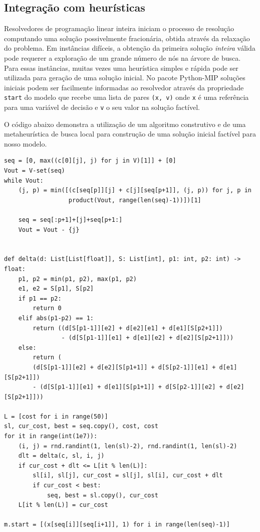 \documentclass[a4paper,11pt,fleqn]{article}
\begin{document}
\subsection{Integração com heurísticas}

Resolvedores de programação linear inteira iniciam o processo de resolução computando uma solução possivelmente fracionária, obtida através da relaxação do problema. Em instâncias difíceis, a obtenção da primeira solução \emph{inteira} válida pode requerer a exploração de um grande número de nós na árvore de busca. Para essas instâncias, muitas vezes uma heurística simples e rápida pode ser utilizada para geração de uma solução inicial. No pacote Python-MIP soluções iniciais podem ser facilmente informadas ao resolvedor através da propriedade \texttt{start} do modelo que recebe uma lista de pares \texttt{(x, v)} onde \texttt{x} é uma referência para uma variável de decisão e \texttt{v} o seu valor na solução factível. 

O código abaixo demonstra a utilização de um algoritmo construtivo e de uma metaheurística de busca local para construção de uma solução inicial factível para nosso modelo.
 
{\small
\begin{lstlisting}
seq = [0, max((c[0][j], j) for j in V)[1]] + [0]
Vout = V-set(seq)
while Vout:
    (j, p) = min([(c[seq[p]][j] + c[j][seq[p+1]], (j, p)) for j, p in
                  product(Vout, range(len(seq)-1))])[1]

    seq = seq[:p+1]+[j]+seq[p+1:]    
    Vout = Vout - {j}


def delta(d: List[List[float]], S: List[int], p1: int, p2: int) -> float:
    p1, p2 = min(p1, p2), max(p1, p2)
    e1, e2 = S[p1], S[p2]
    if p1 == p2:
        return 0
    elif abs(p1-p2) == 1:
        return ((d[S[p1-1]][e2] + d[e2][e1] + d[e1][S[p2+1]])
                - (d[S[p1-1]][e1] + d[e1][e2] + d[e2][S[p2+1]]))
    else:
        return (
        (d[S[p1-1]][e2] + d[e2][S[p1+1]] + d[S[p2-1]][e1] + d[e1][S[p2+1]])
        - (d[S[p1-1]][e1] + d[e1][S[p1+1]] + d[S[p2-1]][e2] + d[e2][S[p2+1]]))

L = [cost for i in range(50)]
sl, cur_cost, best = seq.copy(), cost, cost
for it in range(int(1e7)):
    (i, j) = rnd.randint(1, len(sl)-2), rnd.randint(1, len(sl)-2)
    dlt = delta(c, sl, i, j)
    if cur_cost + dlt <= L[it % len(L)]:
        sl[i], sl[j], cur_cost = sl[j], sl[i], cur_cost + dlt
        if cur_cost < best:
            seq, best = sl.copy(), cur_cost
    L[it % len(L)] = cur_cost
    
m.start = [(x[seq[i]][seq[i+1]], 1) for i in range(len(seq)-1)]    
\end{lstlisting}}
\end{document}
